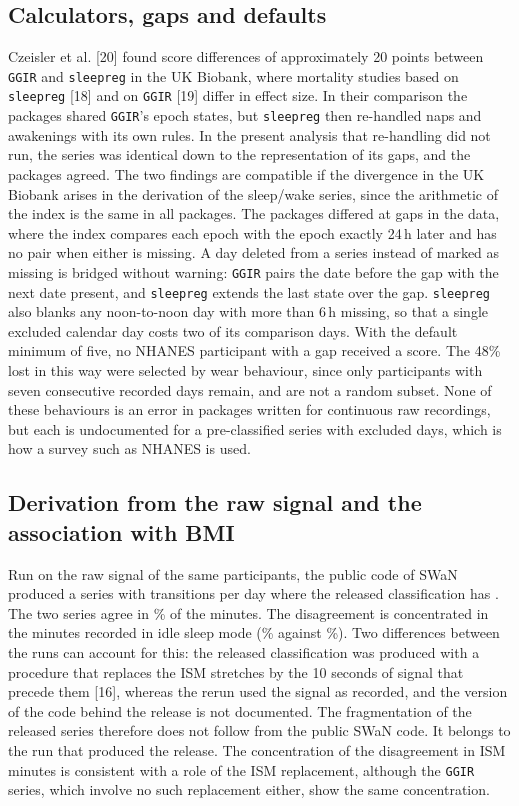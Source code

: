 \documentclass[12pt]{article}
\begin{document}
\subsection{Calculators, gaps and defaults}
Czeisler et al. [20] found score differences of approximately 20 points between
\texttt{GGIR} and \texttt{sleepreg} in the UK Biobank, where mortality studies
based on \texttt{sleepreg} [18] and on \texttt{GGIR} [19] differ in effect size. In their comparison the packages shared
\texttt{GGIR}'s epoch states, but \texttt{sleepreg} then re-handled naps and
awakenings with its own rules. In the present analysis that re-handling did
not run, the series was identical down to the representation of its gaps, and
the packages agreed. The two findings are compatible if the divergence in the
UK Biobank arises in the derivation of the sleep/wake series, since the
arithmetic of the index is the same in all packages. The packages differed at gaps in the data, where the index compares each epoch with the epoch exactly 24\,h later and has no pair when either is missing. A day deleted from a series instead of marked as
missing is bridged without warning: \texttt{GGIR} pairs the date before the
gap with the next date present, and \texttt{sleepreg} extends the last state
over the gap. \texttt{sleepreg} also blanks any noon-to-noon day with more
than 6\,h missing, so that a single excluded calendar day costs two of
its comparison days. With the default minimum of five, no NHANES participant with a gap received a score. The 48\% lost in this way were selected by wear behaviour, since only participants with seven consecutive recorded days remain, and are not a random subset. None of these behaviours is an
error in packages written for continuous raw recordings, but each is
undocumented for a pre-classified series with excluded days, which is how a
survey such as NHANES is used.

\subsection{Derivation from the raw signal and the association with BMI}
Run on the raw signal of the same participants, the public code of SWaN
produced a series with \rawSwanTransDay{} transitions per day where the released
classification has \rawPaxpredmTransDay. The two series agree in \rawSwanAgreeAll\% of the minutes. The disagreement is concentrated in the minutes recorded in idle sleep mode (\rawSwanAgreeIsm\% against
\rawSwanAgreeNon\%). Two differences between the runs can account for this:
the released classification was produced with a procedure that replaces the
ISM stretches by the 10 seconds of signal that precede them [16], whereas the rerun used the signal as recorded,
and the version of the code behind the release is not documented. The
fragmentation of the released series therefore does not follow from the public SWaN code. It belongs to the run that produced the release. The
concentration of the disagreement in ISM minutes is consistent with a role of
the ISM replacement, although the \texttt{GGIR} series, which involve no such
replacement either, show the same concentration.
\end{document}
